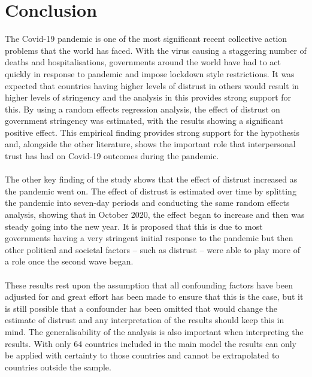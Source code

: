 \documentclass[
  12pt,
]{article}
\begin{document}
\hypertarget{conclusion}{%
\section{Conclusion}\label{conclusion}}

The Covid-19 pandemic is one of the most significant recent collective action problems that the world has faced. With the virus causing a staggering number of deaths and hospitalisations, governments around the world have had to act quickly in response to pandemic and impose lockdown style restrictions. It was expected that countries having higher levels of distrust in others would result in higher levels of stringency and the analysis in this provides strong support for this. By using a random effects regression analysis, the effect of distrust on government stringency was estimated, with the results showing a significant positive effect. This empirical finding provides strong support for the hypothesis and, alongside the other literature, shows the important role that interpersonal trust has had on Covid-19 outcomes during the pandemic.\\
~\\
The other key finding of the study shows that the effect of distrust increased as the pandemic went on. The effect of distrust is estimated over time by splitting the pandemic into seven-day periods and conducting the same random effects analysis, showing that in October 2020, the effect began to increase and then was steady going into the new year. It is proposed that this is due to most governments having a very stringent initial response to the pandemic but then other political and societal factors -- such as distrust -- were able to play more of a role once the second wave began.\\
~\\
These results rest upon the assumption that all confounding factors have been adjusted for and great effort has been made to ensure that this is the case, but it is still possible that a confounder has been omitted that would change the estimate of distrust and any interpretation of the results should keep this in mind. The generalisability of the analysis is also important when interpreting the results. With only 64 countries included in the main model the results can only be applied with certainty to those countries and cannot be extrapolated to countries outside the sample.\\
~\\
\end{document}
